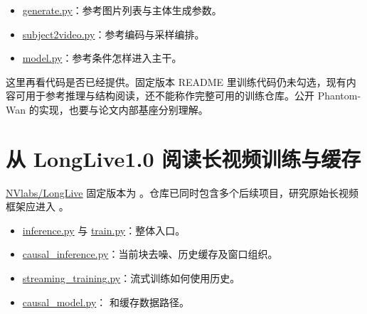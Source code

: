 \begin{itemize}
\tightlist
\item
  \href{https://github.com/Phantom-video/Phantom/blob/bd84b602dcc949e23c89cbbf266b6f5975f2f025/generate.py}{generate.py}：参考图片列表与主体生成参数。
\item
  \href{https://github.com/Phantom-video/Phantom/blob/bd84b602dcc949e23c89cbbf266b6f5975f2f025/phantom_wan/subject2video.py}{subject2video.py}：参考编码与采样编排。
\item
  \href{https://github.com/Phantom-video/Phantom/blob/bd84b602dcc949e23c89cbbf266b6f5975f2f025/phantom_wan/modules/model.py}{model.py}：参考条件怎样进入主干。
\end{itemize}

这里再看代码是否已经提供。固定版本 README 里训练代码仍未勾选，现有内容可用于参考推理与结构阅读，还不能称作完整可用的训练仓库。公开 Phantom-Wan 的实现，也要与论文内部基座分别理解。

\section{从 LongLive1.0 阅读长视频训练与缓存}\label{seedance-m15-ux4ece-longlive1.0-ux9605ux8bfbux957fux89c6ux9891ux8badux7ec3ux4e0eux7f13ux5b58}

\href{https://github.com/NVlabs/LongLive}{NVlabs/LongLive} 固定版本为 。仓库已同时包含多个后续项目，研究原始长视频框架应进入 。

\begin{itemize}
\tightlist
\item
  \href{https://github.com/NVlabs/LongLive/blob/31c70d9071cd7851d82939806dc9fac645fcabe5/LongLive1.0/inference.py}{inference.py} 与 \href{https://github.com/NVlabs/LongLive/blob/31c70d9071cd7851d82939806dc9fac645fcabe5/LongLive1.0/train.py}{train.py}：整体入口。
\item
  \href{https://github.com/NVlabs/LongLive/blob/31c70d9071cd7851d82939806dc9fac645fcabe5/LongLive1.0/pipeline/causal_inference.py}{causal\_inference.py}：当前块去噪、历史缓存及窗口组织。
\item
  \href{https://github.com/NVlabs/LongLive/blob/31c70d9071cd7851d82939806dc9fac645fcabe5/LongLive1.0/pipeline/streaming_training.py}{streaming\_training.py}：流式训练如何使用历史。
\item
  \href{https://github.com/NVlabs/LongLive/blob/31c70d9071cd7851d82939806dc9fac645fcabe5/LongLive1.0/wan/modules/causal_model.py}{causal\_model.py}： 和缓存数据路径。
\end{itemize}


